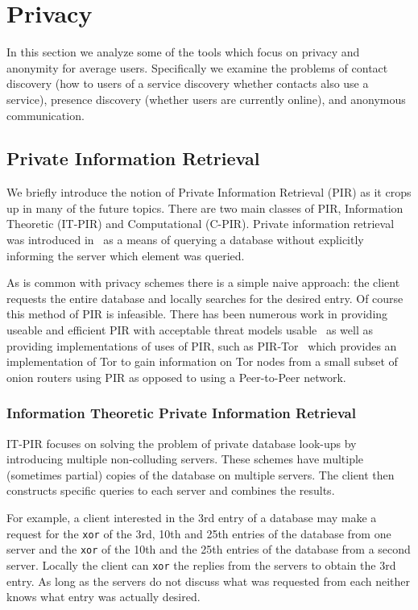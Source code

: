 \section{Privacy}\label{sec:priv}
In this section we analyze some of the tools which focus on privacy and
anonymity for average users. Specifically we examine the problems of contact
discovery (how to users of a service discovery whether contacts also use a
service), presence discovery (whether users are currently online), and anonymous
communication.

\subsection{Private Information Retrieval}\label{ssec:PIR}
We briefly introduce the notion of Private Information Retrieval (PIR) as it
crops up in many of the future topics. There are two main classes of PIR,
Information Theoretic (IT-PIR) and Computational (C-PIR). Private information
retrieval was introduced in~\cite{chor1995private} as a means of querying a
database without explicitly informing the server which element was queried.

As is common with privacy schemes there is a simple naive approach: the client
requests the entire database and locally searches for the desired entry. Of
course this method of PIR is infeasible. There has been numerous work in
providing useable and efficient PIR with acceptable threat models
usable~\cite{aguilar2016xpir,devet2012optimally,beimel2002robust} as well as
providing implementations of uses of PIR, such as PIR-Tor~\cite{mittal2011pir}
which provides an implementation of Tor to gain information on Tor nodes from a
small subset of onion routers using PIR as opposed to using a Peer-to-Peer
network.

\subsubsection{Information Theoretic Private Information Retrieval}
IT-PIR focuses on solving the problem of private database look-ups by
introducing multiple non-colluding servers. These schemes have multiple
(sometimes partial) copies of the database on multiple servers. The client then
constructs specific queries to each server and combines the results.

For example, a client interested in the 3rd entry of a database may make a
request for the \texttt{xor} of the 3rd, 10th and 25th entries of the database
from one server and the \texttt{xor} of the 10th and the 25th entries of the
database from a second server. Locally the client can \texttt{xor} the  replies
from the servers to obtain the 3rd entry. As long as the servers do not discuss
what was requested from each neither knows what entry was actually desired.


